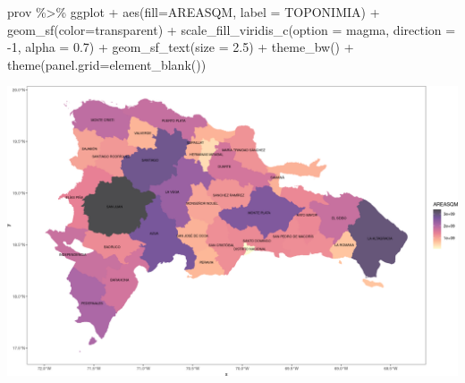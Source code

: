 \documentclass[10pt,landscape,a3paper]{article}
\newenvironment{Shaded}{\begin{snugshade}}{\end{snugshade}}
\newcommand{\AttributeTok}[1]{\textcolor[rgb]{0.77,0.63,0.00}{#1}}
\newcommand{\DecValTok}[1]{\textcolor[rgb]{0.00,0.00,0.81}{#1}}
\newcommand{\FloatTok}[1]{\textcolor[rgb]{0.00,0.00,0.81}{#1}}
\newcommand{\FunctionTok}[1]{\textcolor[rgb]{0.00,0.00,0.00}{#1}}
\newcommand{\NormalTok}[1]{#1}
\newcommand{\SpecialCharTok}[1]{\textcolor[rgb]{0.00,0.00,0.00}{#1}}
\newcommand{\StringTok}[1]{\textcolor[rgb]{0.31,0.60,0.02}{#1}}
\begin{document}
\begin{Shaded}
\begin{Highlighting}[]
\NormalTok{prov }\SpecialCharTok{\%\textgreater{}\%}\NormalTok{ ggplot }\SpecialCharTok{+} \FunctionTok{aes}\NormalTok{(}\AttributeTok{fill=}\NormalTok{AREASQM, }\AttributeTok{label =}\NormalTok{ TOPONIMIA) }\SpecialCharTok{+}
  \FunctionTok{geom\_sf}\NormalTok{(}\AttributeTok{color=}\StringTok{\textquotesingle{}transparent\textquotesingle{}}\NormalTok{) }\SpecialCharTok{+}
  \FunctionTok{scale\_fill\_viridis\_c}\NormalTok{(}\AttributeTok{option =} \StringTok{\textquotesingle{}magma\textquotesingle{}}\NormalTok{, }\AttributeTok{direction =} \SpecialCharTok{{-}}\DecValTok{1}\NormalTok{, }\AttributeTok{alpha =} \FloatTok{0.7}\NormalTok{) }\SpecialCharTok{+}
  \FunctionTok{geom\_sf\_text}\NormalTok{(}\AttributeTok{size =} \FloatTok{2.5}\NormalTok{) }\SpecialCharTok{+}
  \FunctionTok{theme\_bw}\NormalTok{() }\SpecialCharTok{+}
  \FunctionTok{theme}\NormalTok{(}\AttributeTok{panel.grid=}\FunctionTok{element\_blank}\NormalTok{())}
\end{Highlighting}
\end{Shaded}

\begin{center}\includegraphics{img/data-download-preparation-eda/administrative-1} \end{center}
\end{document}
